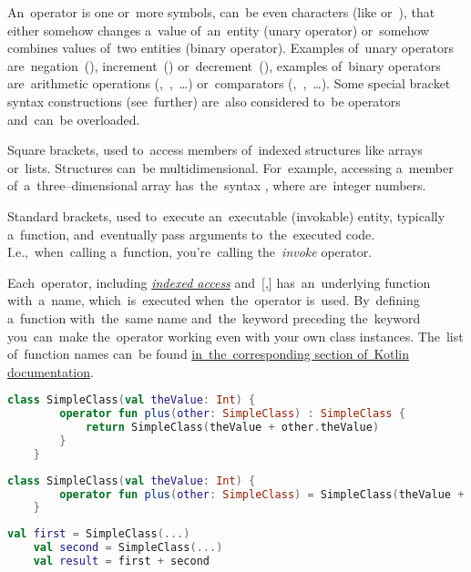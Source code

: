 \label{kotlinoperator}
An~operator is one or~more symbols, can~be even characters (like  or~), that either somehow changes a~value of~an~entity (unary operator) or~somehow combines values of~two entities (binary operator).
Examples of~unary operators are~negation~(\itq{!}), increment~(\itq{++}) or~decrement~(\itq{-{}-}), examples of~binary operators are~arithmetic operations \mbox{(\itq{+}, \itq{-}, \dots)} or~comparators \mbox{(\itq{<}, \itq{>}, \dots)}.
Some special bracket syntax constructions (see~further) are~also considered to~be operators and~can~be overloaded.

\label{kotlinindexedaccess}
Square brackets, used to~access members of~indexed structures like arrays or~lists.
Structures can~be multidimensional.
For~example, accessing a~member of~a~three--dimensional array has~the~syntax \mbox{,} where  are~integer numbers.

\label{kotlininvoke}
Standard brackets, used to~execute an~executable (invokable) entity, typically a~function, and~eventually pass arguments to~the~executed code.
I.e.,~when~calling a~function, you're~calling the~\textit{invoke} operator.
\newpage

\label{kotlinoperatoroverload}
Each~operator, including \hyperref[kotlinindexedaccess]{\textit{indexed access}} and~[,] has~an~underlying function with~a~name, which~is~executed when~the~operator is~used.
By~defining a~function with~the~same name and~the~keyword  preceding the~keyword you~can~make the~operator working even with your own class instances.
The~list of~function names can~be found \href{https://kotlinlang.org/docs/reference/operator-overloading.html}{in~the~corresponding section of~Kotlin documentation}.

\begin{lstlisting}[language=Kotlin, title={Custom class with the operator overloading}]
    class SimpleClass(val theValue: Int) {
        operator fun plus(other: SimpleClass) : SimpleClass {
            return SimpleClass(theValue + other.theValue)
        }
    }
\end{lstlisting}

\begin{lstlisting}[language=Kotlin, title={Equivalent with direct assignment simplification}]
    class SimpleClass(val theValue: Int) {
        operator fun plus(other: SimpleClass) = SimpleClass(theValue + other.theValue)
    }
\end{lstlisting}
\begin{lstlisting}[language=Kotlin, title={Usage}]
    val first = SimpleClass(...)
    val second = SimpleClass(...)
    val result = first + second
\end{lstlisting}
\newline

